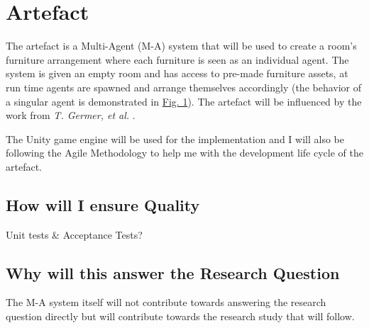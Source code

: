 \section{Artefact}


The artefact is a Multi-Agent (M-A) system that will be used to create a room's furniture arrangement where each furniture is seen as an individual agent. The system is given an empty room and has access to pre-made furniture assets, at run time agents are spawned and arrange themselves accordingly (the behavior of a singular agent is demonstrated in \hyperref[activity-diagram]{Fig. 1}). The artefact will be influenced by the work from \textit{T. Germer, et al.} \cite{real-time-walkthroughs}.

The Unity game engine will be used for the implementation \cite{unity} and I will also be following the Agile Methodology to help me with the development life cycle of the artefact.




\subsection{How will I ensure Quality}
Unit tests \& Acceptance Tests?

\subsection{Why will this answer the Research Question}
The M-A system itself will not contribute towards answering the research question directly but will contribute towards the research study that will follow. 


